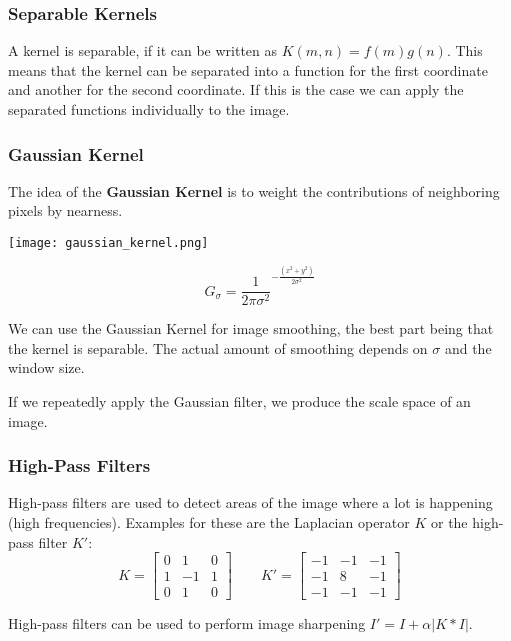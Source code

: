 \subsubsection{Separable Kernels}

A kernel is separable, if it can be written as $K(m, n) = f(m) g(n)$. This means that the kernel can be separated into a function for the first coordinate and another for the second coordinate. If this is the case we can apply the separated functions individually to the image.

\subsubsection{Gaussian Kernel}

The idea of the \textbf{Gaussian Kernel} is to weight the contributions of neighboring pixels by nearness.

\begin{center}
	\texttt{[image: gaussian\_kernel.png]}
\end{center}
$$G_\sigma = \frac{1}{2 \pi \sigma^2}^{- \frac{(x^2 + y^2)}{2 \sigma^2}}$$

We can use the Gaussian Kernel for image smoothing, the best part being that the kernel is separable. The actual amount of smoothing depends on $\sigma$ and the window size. \medskip

If we repeatedly apply the Gaussian filter, we produce the scale space of an image.

\subsubsection{High-Pass Filters}

High-pass filters are used to detect areas of the image where a lot is happening (high frequencies). Examples for these are the Laplacian operator $K$ or the high-pass filter $K'$:
$$ K = 
\begin{bmatrix}
    0 & 1 & 0\\
    1 & -1 & 1\\
    0 & 1 & 0
\end{bmatrix}
\qquad
K' =
\begin{bmatrix}
    -1 & -1 & -1\\
    -1 & 8 & -1\\
    -1 & -1 & -1
\end{bmatrix}
$$

High-pass filters can be used to perform image sharpening $I' = I + \alpha |K * I|$.



